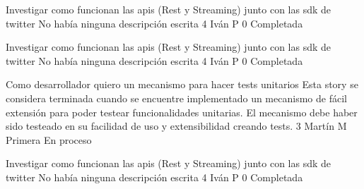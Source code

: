 		{Investigar como funcionan las apis (Rest y Streaming) junto con las sdk de twitter} %
		{No había ninguna descripción escrita} %
		{4} %
		{Iván P} %
		{0} %
		{Completada} %

		{Investigar como funcionan las apis (Rest y Streaming) junto con las sdk de twitter} %
		{No había ninguna descripción escrita} %
		{4} %
		{Iván P} %
		{0} %
		{Completada} %

\vspace{20pt}

			{Como desarrollador quiero un mecanismo para hacer tests unitarios} %
			{Esta story se considera terminada cuando se encuentre implementado un mecanismo de fácil extensión para poder testear funcionalidades unitarias. } %
			{El mecanismo debe haber sido testeado en su facilidad de uso y extensibilidad creando tests.} %
			{3} %
			{Martín M} %
			{Primera} %
			{En proceso} %

		{Investigar como funcionan las apis (Rest y Streaming) junto con las sdk de twitter} %
		{No había ninguna descripción escrita} %
		{4} %
		{Iván P} %
		{0} %
		{Completada} %

